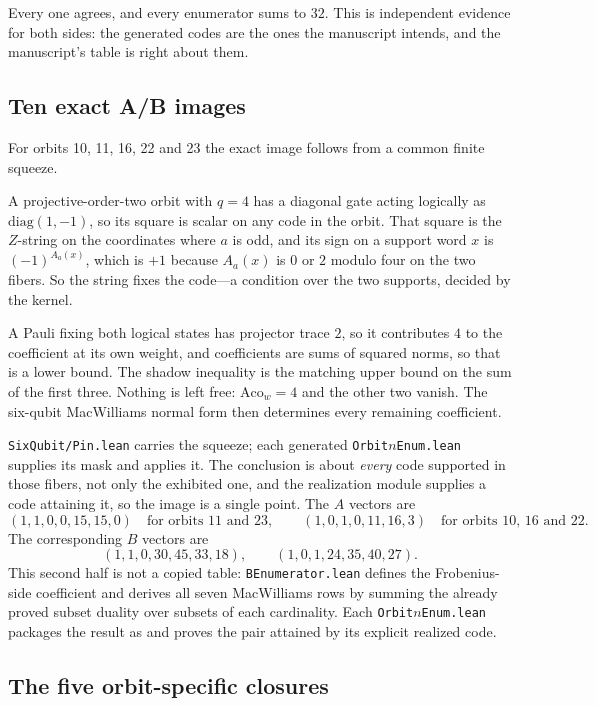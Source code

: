 \documentclass[11pt,a4paper]{article}
\newcommand{\lean}[1]{\texttt{#1}}
\theoremstyle{definition}
\begin{document}
Every one agrees, and every enumerator sums to $32$. This is independent
evidence for both sides: the generated codes are the ones the manuscript
intends, and the manuscript's table is right about them.

\subsection{Ten exact A/B images}

For orbits 10, 11, 16, 22 and 23 the exact image follows from a common finite
squeeze.

A projective-order-two orbit with $q=4$ has a diagonal gate acting logically as
$\mathrm{diag}(1,-1)$, so its square is scalar on any code in the orbit. That
square is the $Z$-string on the coordinates where $a$ is odd, and its sign on a
support word $x$ is $(-1)^{A_a(x)}$, which is $+1$ because $A_a(x)$ is $0$ or
$2$ modulo four on the two fibers. So the string fixes the code---a condition
over the two supports, decided by the kernel.

A Pauli fixing both logical states has projector trace $2$, so it contributes
$4$ to the coefficient at its own weight, and coefficients are sums of squared
norms, so that is a lower bound. The shadow inequality is the matching upper
bound on the sum of the first three. Nothing is left free:
$\mathrm{Aco}_w=4$ and the other two vanish. The six-qubit MacWilliams normal
form then determines every remaining coefficient.

\lean{SixQubit/Pin.lean} carries the squeeze; each generated
\lean{Orbit$n$Enum.lean} supplies its mask and applies it. The conclusion is
about \emph{every} code supported in those fibers, not only the exhibited one,
and the realization module supplies a code attaining it, so the image is a
single point.  The $A$ vectors are
\[
  (1,1,0,0,15,15,0) \quad\text{for orbits 11 and 23},
  \qquad
  (1,0,1,0,11,16,3) \quad\text{for orbits 10, 16 and 22}.
\]
The corresponding $B$ vectors are
\[
  (1,1,0,30,45,33,18),
  \qquad
  (1,0,1,24,35,40,27).
\]
This second half is not a copied table: \lean{BEnumerator.lean} defines the
Frobenius-side coefficient and derives all seven MacWilliams rows by summing
the already proved subset duality over subsets of each cardinality.  Each
\lean{Orbit$n$Enum.lean} packages the result as
 and proves the pair attained by its
explicit realized code.

\subsection{The five orbit-specific closures}
\end{document}
